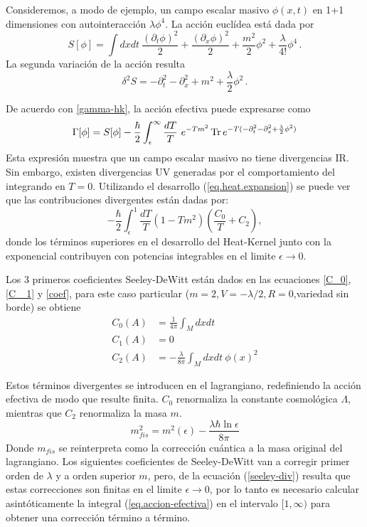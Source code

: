 Consideremos, a modo de ejemplo, un campo escalar masivo $\phi(x,t)$ en 1+1 dimensiones con autointeracción $\lambda \phi ^4 $. La acción euclídea está dada por
\begin{equation}
S[ \phi ] = \int dx dt \ 
\frac{( \partial _t \phi ) ^2}{2} +  
\frac{( \partial _x \phi ) ^2}{2} +
\frac{m ^2 }{2} \phi ^2 +
\frac{\lambda}{4!} \phi ^4 \,.
\end{equation}
La segunda variación de la acción resulta
\begin{equation}
\delta ^2 S = 
- \partial _t ^2 
- \partial _x ^2 
+ m ^2 
+ \frac{\lambda}{2}\phi ^2 \,.
\end{equation}


De acuerdo con \eqref{gamma-hk}, la acción efectiva puede expresarse como
\begin{equation}\label{eq.accion-efectiva}
\Gamma [ \phi ] = 
S[ \phi ] - 
\frac{\hbar }{2}
\int _ { \epsilon } ^{\infty} \frac{ dT}{T} 
\ e ^{- T m ^2 }
\,{\rm Tr} \,  e ^{- T ( - \partial _t ^2 - \partial _x ^2 + \frac{\lambda}{2} \phi ^2 ) }
\end{equation}
Esta expresión muestra que un campo escalar masivo no tiene divergencias IR. Sin embargo, existen divergencias UV generadas por el comportamiento del integrando en $T=0$. Utilizando el desarrollo (\ref{eq.heat.expansion}) se puede ver que las contribuciones divergentes están dadas por:
\begin{equation}\label{seeley-div}
- \frac{\hbar }{2}\int _ { \epsilon } ^{1}  
\frac{ dT}{T} 
\left(
		1 - T m^2
		\right)
\left(
		\frac{C _0}{T} + C _2 
		\right),
\end{equation}
donde los términos superiores en el  desarrollo del Heat-Kernel junto con la exponencial contribuyen con potencias integrables en el limite $\epsilon \rightarrow 0 $.

Los 3 primeros coeficientes Seeley-DeWitt están dados en las ecuaciones \eqref{C_0}, \eqref{C _1} y \eqref{coef}, para este caso particular ($m=2, V = - \lambda /2,R=0$,variedad sin borde) se obtiene
\begin{align}
C _0 (A) &= \frac{1}{4 \pi   }  \int  _{M} d x dt   \\[2mm]
C _1 (A) &= 0 \\[2mm]
C _2 (A) &= - \frac{ \lambda }{8 \pi }  \int _M d x dt \  \phi (x) ^2
\label{coef2}
\end{align} 


Estos términos divergentes se introducen en el lagrangiano, redefiniendo la acción efectiva de modo que resulte finita. $C_0$ renormaliza la constante cosmológica $\Lambda$, mientras que  $C_2$ renormaliza la masa $m$.
\begin{equation}
m ^2 _{fis} = m ^2 ( \epsilon )  - \frac{\lambda \hbar \ln \epsilon}{8 \pi}
\end{equation}
Donde $m _{fis}$ se reinterpreta como la corrección cuántica a la masa original del lagrangiano. Los siguientes coeficientes de  Seeley-DeWitt van a corregir primer orden de $\lambda$ y a orden superior $m$, pero, de la ecuación (\ref{seeley-div}) resulta que estas correcciones son finitas en el limite $\epsilon \rightarrow 0$, por lo tanto es necesario calcular asintóticamente la integral (\ref{eq.accion-efectiva}) en el intervalo $[1, \infty)$ para obtener una corrección término a término.
